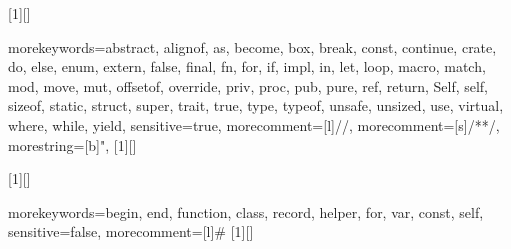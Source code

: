 [1][]{
	\hspace{0mm}
	\lstset{language=c++}
}{%
	\putrefCentered[#1]
	\vspace{3mm}
}
\newcommand{\inlineCppCode}[1]{\lstinline[%
	language=c++,
	keepspaces,
	breakatwhitespace=true,
	breaklines=true
	]{#1}}


{
	morekeywords={abstract, alignof, as, become, box, break, const, continue, crate, do, else, enum, extern, false, final, fn, for, if, impl, in, let, loop, macro, match, mod, move, mut, offsetof, override, priv, proc, pub, pure, ref, return, Self, self, sizeof, static, struct, super, trait, true, type, typeof, unsafe, unsized, use, virtual, where, while, yield},
	sensitive=true,
	morecomment=[l]{//},
	morecomment=[s]{/*}{*/},
	morestring=[b]",
}
[1][]{
	\hspace{0mm}
	\lstset{language=rust}
}{%
	\putrefCentered[#1]
	\vspace{3mm}
} 
\newcommand{\inlineRustCode}[1]{\lstinline[%
	language=rust,
	keepspaces,
	breakatwhitespace=true,
	breaklines=true
	]{#1}}

[1][]{
	\hspace{0mm}
	\lstset{language=scala}
}{
	\putrefCentered[#1]
	\vspace{3mm}
} 
\newcommand{\inlineScalaCode}[1]{\lstinline[%
	language=scala,
	keepspaces,
	breakatwhitespace=true,
	breaklines=true
	]{#1}}

{
	morekeywords={begin, end, function, class, record, helper, for, var, const, self},
	sensitive=false,
	morecomment=[l]{\#}
}
[1][]{
	\hspace{0mm}
	\lstset{language=objectPascal}
}{%
	\putrefCentered[#1]
	\vspace{3mm}
} 
\newcommand{\inlinePascalCode}[1]{\lstinline[%
	language=objectPascal,
	keepspaces,
	breakatwhitespace=true,
	breaklines=true
	]{#1}}

\newcommand{\beastRef}[1]{viz specifikace jazyka Beast (v příloze), oddíl \textit{#1}}
\newcommand{\BeastRef}[1]{Viz specifikace jazyka Beast (v příloze), oddíl \textit{#1}}
